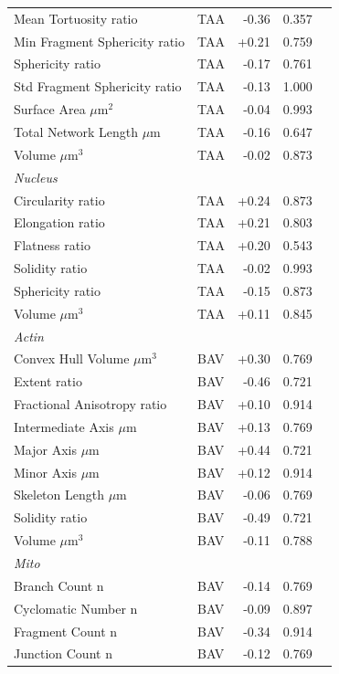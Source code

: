 \documentclass[11pt,a4paper]{article}
\begin{document}
\begin{longtable}{llrrr}
  Mean Tortuosity ratio & TAA & -0.36 & 0.357 &  \\
  Min Fragment Sphericity ratio & TAA & +0.21 & 0.759 &  \\
  Sphericity ratio & TAA & -0.17 & 0.761 &  \\
  Std Fragment Sphericity ratio & TAA & -0.13 & 1.000 &  \\
  Surface Area $\mu$m$^{2}$ & TAA & -0.04 & 0.993 &  \\
  Total Network Length $\mu$m & TAA & -0.16 & 0.647 &  \\
  Volume $\mu$m$^{3}$ & TAA & -0.02 & 0.873 &  \\
\midrule
\multicolumn{5}{l}{\textit{Nucleus}} \\
  Circularity ratio & TAA & +0.24 & 0.873 &  \\
  Elongation ratio & TAA & +0.21 & 0.803 &  \\
  Flatness ratio & TAA & +0.20 & 0.543 &  \\
  Solidity ratio & TAA & -0.02 & 0.993 &  \\
  Sphericity ratio & TAA & -0.15 & 0.873 &  \\
  Volume $\mu$m$^{3}$ & TAA & +0.11 & 0.845 &  \\
\midrule
\multicolumn{5}{l}{\textit{Actin}} \\
  Convex Hull Volume $\mu$m$^{3}$ & BAV & +0.30 & 0.769 &  \\
  Extent ratio & BAV & -0.46 & 0.721 &  \\
  Fractional Anisotropy ratio & BAV & +0.10 & 0.914 &  \\
  Intermediate Axis $\mu$m & BAV & +0.13 & 0.769 &  \\
  Major Axis $\mu$m & BAV & +0.44 & 0.721 &  \\
  Minor Axis $\mu$m & BAV & +0.12 & 0.914 &  \\
  Skeleton Length $\mu$m & BAV & -0.06 & 0.769 &  \\
  Solidity ratio & BAV & -0.49 & 0.721 &  \\
  Volume $\mu$m$^{3}$ & BAV & -0.11 & 0.788 &  \\
\midrule
\multicolumn{5}{l}{\textit{Mito}} \\
  Branch Count n & BAV & -0.14 & 0.769 &  \\
  Cyclomatic Number n & BAV & -0.09 & 0.897 &  \\
  Fragment Count n & BAV & -0.34 & 0.914 &  \\
  Junction Count n & BAV & -0.12 & 0.769 &  \\

\end{longtable}
\end{document}
